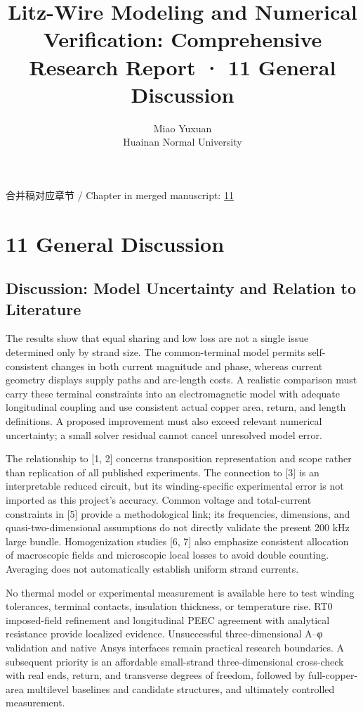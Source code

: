 \documentclass[11pt]{article}
\begin{document}
\title{Litz-Wire Modeling and Numerical Verification: Comprehensive Research Report · 11 General Discussion}
\author{Miao Yuxuan\\Huainan Normal University}
\date{}
\maketitle
\noindent 合并稿对应章节 / Chapter in merged manuscript: \href{report_en_single.pdf#chapter-11}{11}\par
\FloatBarrier
\section*{11 General Discussion}
\hypertarget{chapter-11}{}
\subsection*{Discussion: Model Uncertainty and Relation to Literature}
\hypertarget{11.discussion.heading}{}
The results show that equal sharing and low loss are not a single issue determined only by strand size. The common-terminal model permits self-consistent changes in both current magnitude and phase, whereas current geometry displays supply paths and arc-length costs. A realistic comparison must carry these terminal constraints into an electromagnetic model with adequate longitudinal coupling and use consistent actual copper area, return, and length definitions. A proposed improvement must also exceed relevant numerical uncertainty; a small solver residual cannot cancel unresolved model error.


The relationship to [1, 2] concerns transposition representation and scope rather than replication of all published experiments. The connection to [3] is an interpretable reduced circuit, but its winding-specific experimental error is not imported as this project’s accuracy. Common voltage and total-current constraints in [5] provide a methodological link; its frequencies, dimensions, and quasi-two-dimensional assumptions do not directly validate the present 200 kHz large bundle. Homogenization studies [6, 7] also emphasize consistent allocation of macroscopic fields and microscopic local losses to avoid double counting. Averaging does not automatically establish uniform strand currents.


No thermal model or experimental measurement is available here to test winding tolerances, terminal contacts, insulation thickness, or temperature rise. RT0 imposed-field refinement and longitudinal PEEC agreement with analytical resistance provide localized evidence. Unsuccessful three-dimensional A–φ validation and native Ansys interfaces remain practical research boundaries. A subsequent priority is an affordable small-strand three-dimensional cross-check with real ends, return, and transverse degrees of freedom, followed by full-copper-area multilevel baselines and candidate structures, and ultimately controlled measurement.
\end{document}
